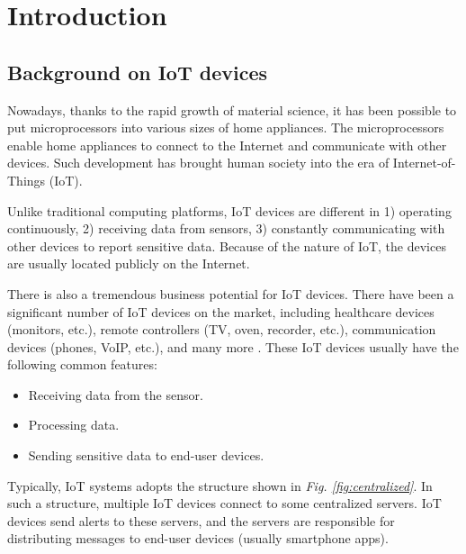\chapter{Introduction}

\section{Background on IoT devices}

Nowadays, thanks to the rapid growth of material science, it has been possible to put microprocessors into various sizes of home appliances. The microprocessors enable home appliances to connect to the Internet and communicate with other devices. Such development has brought human society into the era of Internet-of-Things (IoT). 

Unlike traditional computing platforms, IoT devices are different in 1) operating continuously, 2) receiving data from sensors, 3) constantly communicating with other devices to report sensitive data. Because of the nature of IoT, the devices are usually located publicly on the Internet. 

There is also a tremendous business potential for IoT devices. There have been a significant number of IoT devices on the market, including healthcare devices (monitors, etc.), remote controllers (TV, oven, recorder, etc.), communication devices (phones, VoIP, etc.), and many more \cite{hoang2015tor}. These IoT devices usually have the following common features:

\begin{itemize}
	\item Receiving data from the sensor.
	\item Processing data.
	\item Sending sensitive data to end-user devices. 
\end{itemize}

Typically, IoT systems adopts the structure shown in \textit{Fig. \ref{fig:centralized}}. In such a structure, multiple IoT devices connect to some centralized servers. IoT devices send alerts to these servers, and the servers are responsible for distributing messages to end-user devices (usually smartphone apps).

